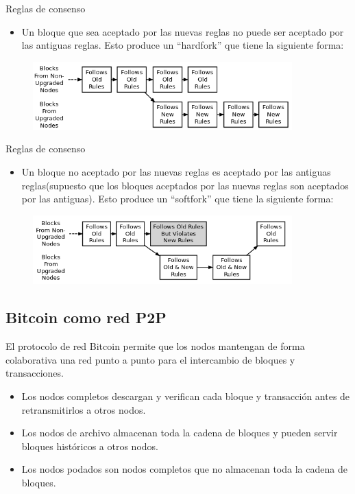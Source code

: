 \documentclass[compress,brown,xcolor=table]{beamer}
\begin{document}
\begin{frame}{Reglas de consenso}
	\begin{itemize}
	\item Un bloque que sea aceptado por las nuevas reglas no puede ser aceptado por las antiguas reglas. Esto produce un ``hardfork'' que tiene la siguiente forma:
\end{itemize}
	\begin{figure}[h]
	\includegraphics[width=10cm]{../images/hardforking1.png}
	\centering		
	\label{p3}
	\end{figure}
\end{frame}

\begin{frame}{Reglas de consenso}
	\begin{itemize}
	\item Un bloque no aceptado por las nuevas reglas es aceptado por las antiguas reglas(supuesto que los bloques aceptados por las nuevas reglas son aceptados por las antiguas).  Esto produce un ``softfork'' que tiene la siguiente forma:
\end{itemize}
	\begin{figure}[h]
	\includegraphics[width=10cm]{../images/softforking2.png}
	\centering		
	\label{p3}
	\end{figure}
\end{frame}

\subsection{Bitcoin como red P2P}
\frame{\sectionpage}

\begin{frame}
El protocolo de red Bitcoin permite que los nodos mantengan de forma colaborativa una red punto a punto para el intercambio de bloques y transacciones.

\begin{itemize}
	\item Los nodos completos descargan y verifican cada bloque y transacción antes de retransmitirlos a otros nodos.
	\item Los nodos de archivo almacenan toda la cadena de bloques y pueden servir bloques históricos a otros nodos.
	\item Los nodos podados son nodos completos que no almacenan toda la cadena de bloques.
\end{itemize}

\end{frame}
\end{document}
